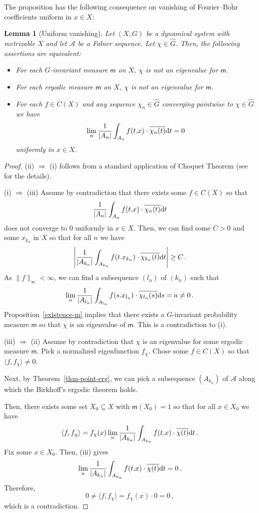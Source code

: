 \documentclass [14pt]{amsart}
\numberwithin{equation}{section}
\newcommand{\cA}{{\mathcal A}}
\newcommand{\mm}{\mathsf{m}}
\newcommand{\dd}{\mbox{\rm d}}
\newtheorem{lemma}[theorem]{Lemma}
\begin{document}
The proposition has the following consequence on vanishing of Fourier--Bohr coefficients uniform in $x\in X$:

\begin{lemma}[Uniform vanishing] Let $(X,G)$ be a dynamical system with metrizable $X$ and let $\cA$ be a F\o lner sequence. Let $\chi \in \widehat{G}$.
Then, the following assertions are equivalent:
\begin{itemize}
  \item[(i)] For each $G$-invariant measure $\mm$ on $X$, $\chi$ is not an eigenvalue for $\mm$.
  \item[(ii)] For each ergodic measure $\mm$ on $X$, $\chi$ is not an eigenvalue for $\mm$.
  \item[(iii)]  For each $f\in C(X)$ and any sequence $\chi_n \in \widehat{G}$ converging pointwise to $\chi \in\widehat{G}$  we have
\[
\lim_n \frac{1}{|A_n|} \int_{A_n}  f(t.x) \cdot \overline{\chi_n(t)} \dd t =0
\]
uniformly in $x\in X$.
\end{itemize}
\end{lemma}
\begin{proof}
(ii) $\Longrightarrow$ (i) follows from a standard application of Choquet Theorem \cite{Phe} (see \cite{FRS} for the details).


\smallskip

(i) $\Longrightarrow$ (iii) Assume by contradiction that there exists some  $f \in C(X)$  so that
\[
\frac{1}{|A_n|} \int_{A_n} f(t.x) \cdot \overline{\chi_n(t)} \dd t
\]
 does not converge to $0$ uniformly in $x\in X$. Then, we can find some $C>0$ and some $x_{k_n}$ in $X$ so that for all $n$ we have
\[
\left|\frac{1}{|A_{k_n}|} \int_{A_{k_n}} f(t.x_{k_n}) \cdot \overline{\chi_{k_n}(t)} \dd t \right| \geq C \,.
\]
As $\| f \|_\infty < \infty$, we can find a subsequence $(l_n)$ of $(k_n)$ such that
\[
\lim_n \frac{1}{|A_{l_n}|} \int_{A_{l_n}}  f(s.x_{l_n}) \cdot  \overline{\chi_{l_n}(s)}  \dd s  = a \neq 0 \,.
\]
Proposition~\ref{existence-m} implies that there exists a $G$-invariant probability measure $\mm$ so that $\chi$ is an eigenvalue of $\mm$. This is a contradiction to (i).

\smallskip


(iii) $\Longrightarrow$ (ii) Assume by contradiction that $\chi$ is an eigenvalue for some ergodic measure $\mm$. Pick a normalized eigenfunction $f_\chi$.
Chose some $f \in C(X)$ so that $\langle f, f_\chi \rangle \neq 0$.

Next, by Theorem~\ref{thm-point-erg}, we can pick a subsequence $ (A_{k_n})$ of $\cA$ along which the Birkhoff's ergodic theorem holds.

Then, there exists some set $X_0 \subseteq X$ with $\mm(X_0)=1$ so that for all $x \in X_0$ we have
\[
\langle f, f_\chi \rangle =f_{\chi}(x) \lim_n \frac{1}{|A_{k_n}|} \int_{A_{k_n}} f(t.x) \cdot \overline{\chi(t)}\dd t \, .
\]
Fix some $x \in X_0$. Then, (iii) gives
\[
\lim_n \frac{1}{|A_{k_n}|} \int_{A_{k_n}}f(t.x)\cdot \overline{\chi(t)} \dd t=0 \,.
\]
Therefore,
\[
0 \neq \langle f, f_\chi \rangle = f_\chi(x) \cdot 0 =0 \,,
\]
which is a contradiction.
\end{proof}
\end{document}
